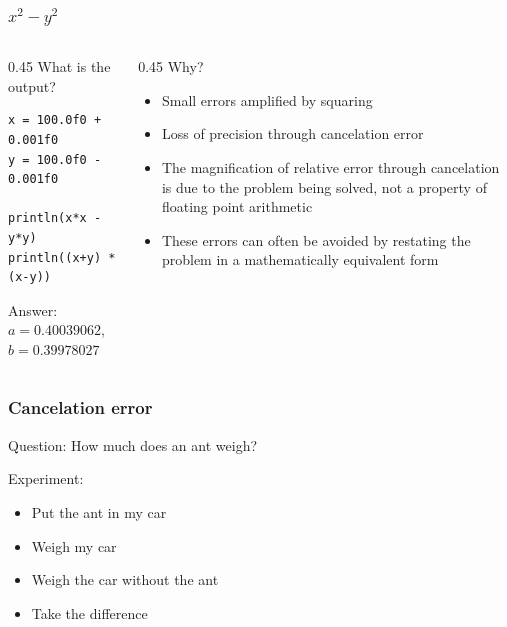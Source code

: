 \documentclass[aspectratio=169,hyperref={bookmarks=false,urlcolor=blue,colorlinks=true},10pt]{beamer}
\begin{document}
\begin{frame}[fragile]
  \frametitle{$x^2-y^2$}

  \begin{columns}[t]
    \begin{column}{0.45\textwidth}
      What is the output?

      \begin{lstlisting}
x = 100.0f0 + 0.001f0
y = 100.0f0 - 0.001f0

println(x*x - y*y)
println((x+y) * (x-y))
      \end{lstlisting}

      \pause

      Answer: $a=0.40039062$, $b=0.39978027$
    \end{column}
    \begin{column}{0.45\textwidth}
      Why?

      \pause

      \begin{itemize}
      \item Small errors amplified by squaring
      \item Loss of precision through cancelation error
      \item The magnification of relative error through cancelation is due to the problem being
        solved, not a property of floating point arithmetic
      \item These errors can often be avoided by restating the problem in a mathematically
        equivalent form
      \end{itemize}
    \end{column}
  \end{columns}
\end{frame}

\begin{frame}
  \frametitle{Cancelation error}

  Question: How much does an ant weigh?

  \vspace{\baselineskip}

  Experiment:
  \begin{itemize}
  \item Put the ant in my car
  \item Weigh my car
  \item Weigh the car without the ant
  \item Take the difference
  \end{itemize}
\end{frame}
\end{document}
